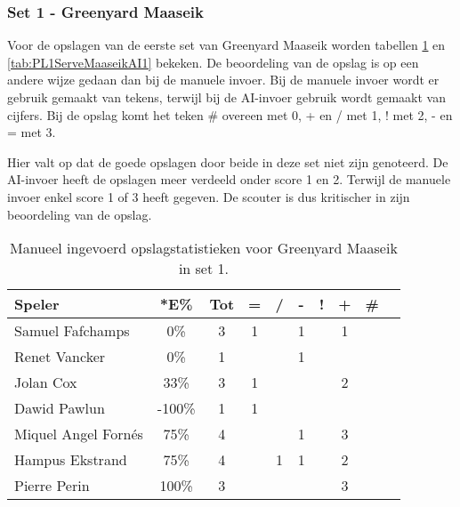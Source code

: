 \subsubsection{Set 1 - Greenyard Maaseik}
\label{sec:PL1_Greenyard1}
Voor de opslagen van de eerste set van Greenyard Maaseik worden tabellen \ref{tab:PL1ServeMaaseikMan1} en \ref{tab:PL1ServeMaaseikAI1} bekeken. De beoordeling van de opslag is op een andere wijze gedaan dan bij de manuele invoer. Bij de manuele invoer wordt er gebruik gemaakt van tekens, terwijl bij de AI-invoer gebruik wordt gemaakt van cijfers. Bij de opslag komt het teken \# overeen met 0, + en / met 1, ! met 2, - en = met 3.

Hier valt op dat de goede opslagen door beide in deze set niet zijn genoteerd. De AI-invoer heeft de opslagen meer verdeeld onder score 1 en 2. Terwijl de manuele invoer enkel score 1 of 3 heeft gegeven. De scouter is dus kritischer in zijn beoordeling van de opslag.

\begin{table}[ht!]
    \centering
    \scriptsize
    \begin{tabular}{|l|c|c|c|c|c|c|c|c|c|}
      \hline
      \textbf{Speler} & *E\% & Tot & = & / & - & ! & + & \# \\ \hline
      Samuel Fafchamps & 0\% & 3 & 1 &  & 1 &  & 1 &  \\ 
      Renet Vancker & 0\% & 1 &  &  & 1 &  &  &  \\ 
      Jolan Cox  & 33\% & 3 & 1 &  &  &  & 2 &  \\ 
      Dawid Pawlun  & -100\% & 1 & 1 &  &  &  &  &  \\ 
      Miquel Angel Fornés & 75\% & 4 &  &  & 1 &  & 3 &  \\
      Hampus Ekstrand & 75\% & 4 &  & 1 & 1 &  & 2 &  \\
      Pierre Perin & 100\% & 3 &  &  &  &  & 3 &  \\ \hline
    \end{tabular}
    \caption[Manueel ingevoerde opslagstatistieken voor Greenyard Maaseik in set 1]{\label{tab:PL1ServeMaaseikMan1}Manueel ingevoerd opslagstatistieken voor Greenyard Maaseik in set 1.}
\end{table}

